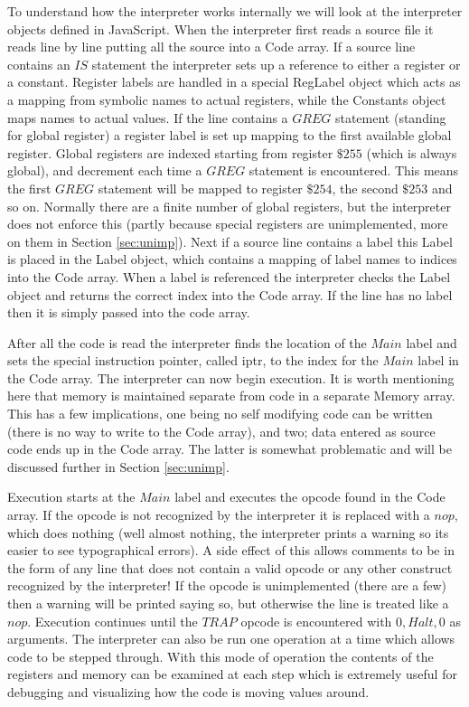 \documentclass[conference]{IEEEtran}
\begin{document}
To understand how the interpreter works internally we will look at the interpreter objects defined in JavaScript. When the interpreter first reads a source file it reads line by line putting all the source into a Code array. If a source line contains an $IS$ statement the interpreter sets up a reference to either a register or a constant. Register labels are handled in a special RegLabel object which acts as a mapping from symbolic names to actual registers, while the Constants object maps names to actual values. If the line contains a $GREG$ statement (standing for global register) a register label is set up mapping to the first available global register. Global registers are indexed starting from register $\$255$ (which is always global), and decrement each time a $GREG$ statement is encountered. This means the first $GREG$ statement will be mapped to register $\$254$, the second $\$253$ and so on. Normally there are a finite number of global registers, but the interpreter does not enforce this (partly because special registers are unimplemented, more on them in Section \ref{sec:unimp}). Next if a source line contains a label this Label is placed in the Label object, which contains a mapping of label names to indices into the Code array. When a label is referenced the interpreter checks the Label object and returns the correct index into the Code array. If the line has no label then it is simply passed into the code array.

After all the code is read the interpreter finds the location of the $Main$ label and sets the special instruction pointer, called iptr, to the index for the $Main$ label in the Code array. The interpreter can now begin execution. It is worth mentioning here that memory is maintained separate from code in a separate Memory array. This has a few implications, one being no self modifying code can be written (there is no way to write to the Code array), and two; data entered as source code ends up in the Code array. The latter is somewhat problematic and will be discussed further in Section \ref{sec:unimp}.

Execution starts at the $Main$ label and executes the opcode found in the Code array. If the opcode is not recognized by the interpreter it is replaced with a $nop$, which does nothing (well almost nothing, the interpreter prints a warning so its easier to see typographical errors). A side effect of this allows comments to be in the form of any line that does not contain a valid opcode or any other construct recognized by the interpreter! If the opcode is unimplemented (there are a few) then a warning will be printed saying so, but otherwise the line is treated like a $nop$. Execution continues until the $TRAP$ opcode is encountered with $0,Halt,0$ as arguments. The interpreter can also be run one operation at a time which allows code to be stepped through. With this mode of operation the contents of the registers and memory can be examined at each step which is extremely useful for debugging and visualizing how the code is moving values around.
\end{document}
